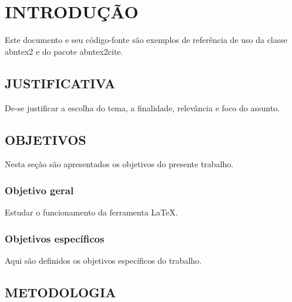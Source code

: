 \documentclass[
	12pt,				%
	openright,			%
	oneside,			%
	a4paper,			%
	chapter=TITLE,		%
	section=TITLE,		%
	brazil				%
	]{abntex2}
\begin{document}
\tableofcontents*
\clearpage

\textual



\chapter{INTRODUÇÃO}

Este documento e seu código-fonte são exemplos de referência de uso da classe
\textsf{abntex2} e do pacote \textsf{abntex2cite}.

\section{JUSTIFICATIVA}

De-se justificar a escolha do tema, a finalidade, relevância e foco do assunto.

\section{OBJETIVOS}

Nesta seção são apresentados os objetivos do presente trabalho.

\subsection{Objetivo geral}

Estudar o funcionamento da ferramenta \LaTeX.

\subsection{Objetivos específicos}

Aqui são definidos os objetivos específicos do trabalho.

\section{METODOLOGIA}
\end{document}
